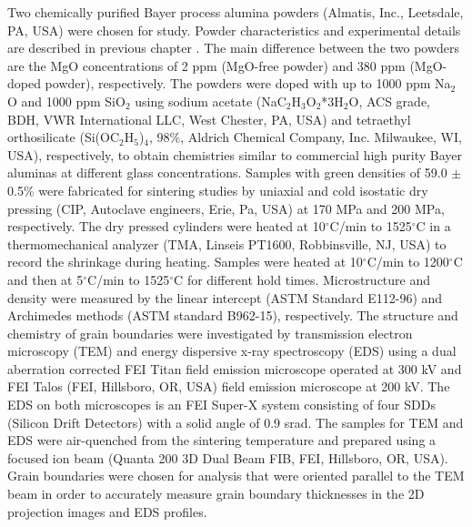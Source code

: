 Two chemically purified Bayer process alumina powders (Almatis, Inc., Leetsdale, PA, USA) were chosen for study. Powder characteristics and experimental details are described in previous chapter \cite{Frueh2016}. The main difference between the two powders are the MgO concentrations of 2 ppm (MgO-free powder) and 380 ppm (MgO-doped powder), respectively. The powders were doped with up to 1000 ppm Na$_{2}$O and 1000 ppm SiO$_{2}$ using sodium acetate (NaC$_{2}$H$_{3}$O$_{2}$*3H$_{2}$O, ACS grade, BDH, VWR International LLC, West Chester, PA, USA) and tetraethyl orthosilicate (Si(OC$_{2}$H$_{5}$)$_{4}$, 98\%, Aldrich Chemical Company, Inc. Milwaukee, WI, USA), respectively, to obtain chemistries similar to commercial high purity Bayer aluminas at different glass concentrations. Samples with green densities of 59.0 $\pm$ 0.5\% were fabricated for sintering studies by uniaxial and cold isostatic dry pressing (CIP, Autoclave engineers, Erie, Pa, USA) at 170 MPa and 200 MPa, respectively. The dry pressed cylinders were heated at 10$^{\circ}$C/min to 1525$^{\circ}$C in a thermomechanical analyzer (TMA, Linseis PT1600, Robbinsville, NJ, USA) to record the shrinkage during heating. Samples were heated at 10$^{\circ}$C/min to 1200$^{\circ}$C and then at 5$^{\circ}$C/min to 1525$^{\circ}$C for different hold times. Microstructure and density were measured by the linear intercept (ASTM Standard E112-96) \cite{Standard2013} and Archimedes methods (ASTM standard B962-15), \cite{Standard2015} respectively. The structure and chemistry of grain boundaries were investigated by transmission electron microscopy (TEM) and energy dispersive x-ray spectroscopy (EDS) using a dual aberration corrected FEI Titan \cite{Clarke1987} field emission microscope operated at 300 kV and FEI Talos (FEI, Hillsboro, OR, USA) field emission microscope at 200 kV. The EDS on both microscopes is an FEI Super-X system consisting of four SDDs (Silicon Drift Detectors) with a solid angle of 0.9 srad. The samples for TEM and EDS were air-quenched from the sintering temperature and prepared using a focused ion beam (Quanta 200 3D Dual Beam FIB, FEI, Hillsboro, OR, USA).  Grain boundaries were chosen for analysis that were oriented parallel to the TEM beam in order to accurately measure grain boundary thicknesses in the 2D projection images and EDS profiles.

